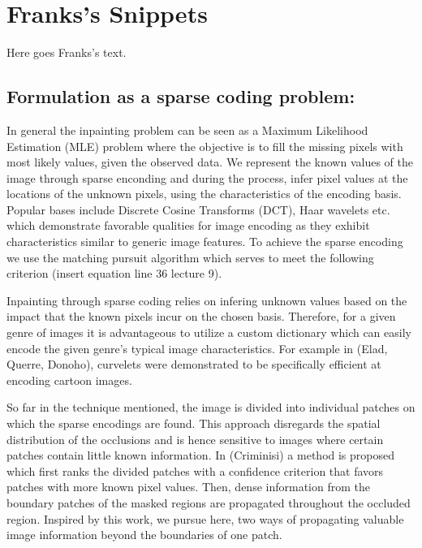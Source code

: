 \section*{Franks's Snippets}
Here goes Franks's text.

\subsection{Formulation as a sparse coding problem:}

In general the inpainting problem can be seen as a Maximum Likelihood Estimation (MLE) problem where the objective is to fill the missing pixels with most likely values, given the observed data. We represent the known values of the image through sparse enconding and during the process, infer pixel values at the locations of the unknown pixels, using the characteristics of the encoding basis. Popular bases include Discrete Cosine Transforms (DCT), Haar wavelets etc. which demonstrate favorable qualities for image encoding as they exhibit characteristics similar to generic image features. To achieve the sparse encoding we use the matching pursuit algorithm which serves to meet the following criterion (insert equation line 36 lecture 9).

Inpainting through sparse coding relies on infering unknown values based on the impact that the known pixels incur on the chosen basis. Therefore, for a given genre of images it is advantageous to utilize a custom dictionary which can easily encode the given genre's typical image characteristics. For example  in (Elad, Querre, Donoho), curvelets were demonstrated to be specifically efficient at encoding cartoon images. 

So far in the technique mentioned, the image is divided into individual patches on which the sparse encodings are found. This approach disregards the spatial distribution of the occlusions and is hence sensitive to images where certain patches contain little known information. In (Criminisi) a method is proposed which first ranks the divided patches with a confidence criterion that favors patches with more known pixel values. Then, dense information from the boundary patches of the masked regions are propagated throughout the occluded region. Inspired by this work, we pursue here, two ways of propagating valuable image information beyond the boundaries of one patch.

